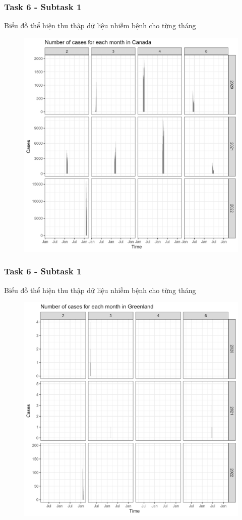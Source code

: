 \documentclass[english,10pt,table]{beamer}
\begin{document}
\frame
{
    \frametitle{Task 6 - Subtask 1}
    \begin{block}{Biểu đồ thể hiện thu thập dữ liệu nhiễm bệnh cho từng tháng}
    \begin{figure}[H]
		\centering
		\includegraphics[scale=0.11]{images/6.1.1.png}
	\end{figure}
    \end{block}
}
\frame
{
    \frametitle{Task 6 - Subtask 1}
    \begin{block}{Biểu đồ thể hiện thu thập dữ liệu nhiễm bệnh cho từng tháng}
    \begin{figure}[H]
		\centering
		\includegraphics[scale=0.11]{images/6.1.2.png}
	\end{figure}
    \end{block}
}
\end{document}
